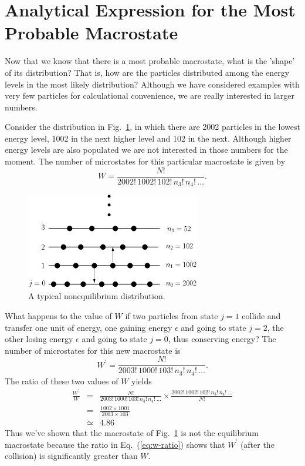 \section[Most Probable Macrostate]{Analytical Expression for the Most 
Probable Macrostate}
\label{sec:analytical}
Now that we know that there is a most probable macrostate, what is the
'shape' of its distribution?  That is, how are the particles
distributed among the energy levels in the most likely distribution?
Although we have considered examples with very few particles for
calculational convenience, we are really interested in larger numbers.

Consider the distribution in Fig.~\ref{fig:nonequilib}, in which there
are 2002 particles in the lowest energy level, 1002 in the next higher
level and 102 in the next.  Although higher energy levels are also
populated we are not interested in those numbers for the moment.  The
number of microstates for this particular macrostate is given by
\begin{equation}
W = \frac{N!}{2002!\,1002!\,102!\,n_3!\,n_4!\,\dots}.
\end{equation}

\begin{figure}[b]
\begin{center}
\includegraphics[width=3in]{statistical_mechanics/nonequilib.eps}
\end{center}
\caption{A typical nonequilibrium distribution.}
\label{fig:nonequilib}
\end{figure}

What happens to the value of $W$ if two particles from state $j = 1$
collide and transfer one unit of energy, one gaining energy $\epsilon$
and going to state $j = 2$, the other losing energy $\epsilon$ and
going to state $j = 0$, thus conserving energy?  The number of
microstates for this new macrostate is
\begin{equation}
W^\prime = \frac{N!}{2003!\,1000!\,103!\,n_3!\,n_4!\,\dots}.
\end{equation}
The ratio of these two values of $W$ yields
\begin{eqnarray}
\frac{W^\prime}{W} &=& \frac{N!}{2003!\,1000!\,103!\,n_3!\,n_4!\,\dots}\times 
                       \frac{2002!\,1002!\,102!\,n_3!\,n_4!\,\dots}{N!} 
                                   \nonumber \\
                   &=& \frac{1002\times 1001}{2003\times 103}\nonumber \\
                   &\simeq& 4.86 
\label{eq:w-ratio}
\end{eqnarray}
Thus we've shown that the macrostate of Fig.~\ref{fig:nonequilib} is
not the equilibrium macrostate because the ratio in
Eq.~(\ref{eq:w-ratio}) shows that $W^\prime$ (after the collision) is
significantly greater than $W$.

